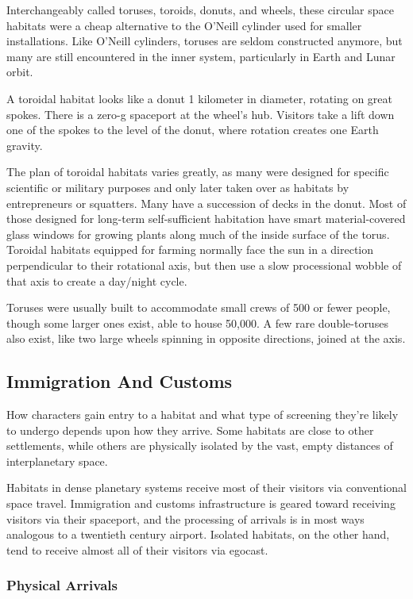 Interchangeably called toruses, toroids, donuts, and 
wheels, these circular space habitats were a cheap 
alternative to the O'Neill cylinder used for smaller 
installations. Like O'Neill cylinders, toruses are seldom 
constructed anymore, but many are still encountered in 
the inner system, particularly in Earth and Lunar orbit.

A toroidal habitat looks like a donut 1 kilometer in 
diameter, rotating on great spokes. There is a zero-g 
spaceport at the wheel's hub. Visitors take a lift down 
one of the spokes to the level of the donut, where 
rotation creates one Earth gravity.

The plan of toroidal habitats varies greatly, as many 
were designed for specific scientific or military purposes 
and only later taken over as habitats by entrepreneurs 
or squatters. Many have a succession of decks in the 
donut. Most of those designed for long-term self-sufficient
habitation have smart material-covered glass
windows for growing plants along much of the inside 
surface of the torus. Toroidal habitats equipped for 
farming normally face the sun in a direction perpendicular
to their rotational axis, but then use a slow processional
wobble of that axis to create a day/night cycle.

Toruses were usually built to accommodate small 
crews of 500 or fewer people, though some larger 
ones exist, able to house 50,000. A few rare double-toruses
also exist, like two large wheels spinning in
opposite directions, joined at the axis.

\subsection{Immigration And Customs}

How characters gain entry to a habitat and what type 
of screening they're likely to undergo depends upon 
how they arrive. Some habitats are close to other 
settlements, while others are physically isolated by the 
vast, empty distances of interplanetary space.

Habitats in dense planetary systems receive most of 
their visitors via conventional space travel. Immigration
and customs infrastructure is geared toward receiving
visitors via their spaceport, and the processing
of arrivals is in most ways analogous to a twentieth 
century airport. Isolated habitats, on the other hand, 
tend to receive almost all of their visitors via egocast.

\subsubsection{Physical Arrivals}

